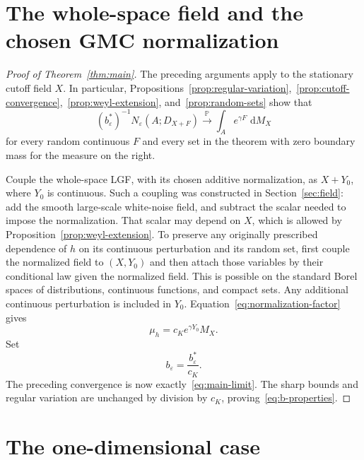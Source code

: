 \documentclass[11pt,letterpaper]{article}
\renewcommand{\P}{\mathbb P}
\newcommand{\eps}{\varepsilon}
\newcommand{\dd}{\,\mathrm d}
\theoremstyle{definition}
\theoremstyle{remark}
\numberwithin{equation}{section}
\begin{document}
\section{The whole-space field and the chosen GMC normalization}

\begin{proof}[Proof of Theorem~\ref{thm:main}]
The preceding arguments apply to the stationary cutoff field $X$. In particular, Propositions~\ref{prop:regular-variation},~\ref{prop:cutoff-convergence},~\ref{prop:weyl-extension}, and~\ref{prop:random-sets} show that
\begin{equation*}
 (b_\eps^*)^{-1}N_\eps(A;D_{X+F})
 \xrightarrow{\P} \int_A e^{\gamma F}\,\dd M_X
\end{equation*}
for every random continuous $F$ and every set in the theorem with zero boundary mass for the measure on the right.

Couple the whole-space LGF, with its chosen additive normalization, as $X+Y_0$, where $Y_0$ is continuous. Such a coupling was constructed in Section~\ref{sec:field}: add the smooth large-scale white-noise field, and subtract the scalar needed to impose the normalization. That scalar may depend on $X$, which is allowed by Proposition~\ref{prop:weyl-extension}. To preserve any originally prescribed dependence of $h$ on its continuous perturbation and its random set, first couple the normalized field to $(X,Y_0)$ and then attach those variables by their conditional law given the normalized field. This is possible on the standard Borel spaces of distributions, continuous functions, and compact sets. Any additional continuous perturbation is included in $Y_0$. Equation~\eqref{eq:normalization-factor} gives
\begin{equation*}
 \mu_h=c_K e^{\gamma Y_0}M_X.
\end{equation*}
Set
\begin{equation}\label{eq:final-b}
 b_\eps=\frac{b_\eps^*}{c_K}.
\end{equation}
The preceding convergence is now exactly~\eqref{eq:main-limit}. The sharp bounds and regular variation are unchanged by division by $c_K$, proving~\eqref{eq:b-properties}.
\end{proof}

\section{The one-dimensional case}
\end{document}
